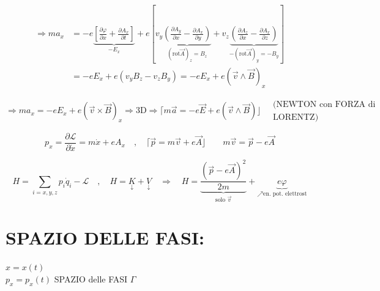 \documentclass[12pt,a4paper]{article}
\begin{document}
\begin{align*}
    \Rightarrow ma_x &= -e\underbrace{\left[ \frac{\partial \varphi}{\partial x} + \frac{\partial A_x}{\partial t} \right]}_{-E_x} + e\left[ v_y \underbrace{\left( \frac{\partial A_y}{\partial x} - \frac{\partial A_x}{\partial y} \right)}_{(\text{rot}\vec{A})_z = B_z} + v_z \underbrace{\left( \frac{\partial A_z}{\partial x} - \frac{\partial A_x}{\partial z} \right)}_{-(\text{rot}\vec{A})_y = -B_y} \right] \\
    &= -eE_x + e(v_y B_z - v_z B_y) = -eE_x + e(\vec{v} \wedge \vec{B})_x
\end{align*}

\begin{equation*}
    \Rightarrow ma_x = -eE_x + e(\vec{v} \times \vec{B})_x \Rightarrow \text{3D} \Rightarrow \lceil m\vec{a} = -e\vec{E} + e(\vec{v} \wedge \vec{B}) \rfloor \quad \begin{matrix} \text{(NEWTON con FORZA di} \\ \text{LORENTZ)} \end{matrix}
\end{equation*}

\vspace{0.8cm}
\begin{equation*}
    p_x = \frac{\partial \mathcal{L}}{\partial \dot{x}} = m\dot{x} + eA_x \quad , \quad \lceil \vec{p} = m\vec{v} + e\vec{A} \rfloor \qquad m\vec{v} = \vec{p} - e\vec{A}
\end{equation*}

\begin{equation*}
    H = \sum_{i=x,y,z} p_i \dot{q}_i - \mathcal{L} \quad , \quad H = \underset{\downarrow}{K} + \underset{\downarrow}{V} \quad \Rightarrow \quad \boxed{ H = \underbrace{\frac{(\vec{p} - e\vec{A})^2}{2m}}_{\text{solo } \vec{v}} + \underbrace{e\varphi}_{\nearrow \text{en. pot. elettrost}} }
\end{equation*}

\newpage
\section*{SPAZIO DELLE FASI:}

\noindent $x = x(t)$ \\
$p_x = p_x(t)$ \hfill SPAZIO delle FASI $\Gamma$
\end{document}
